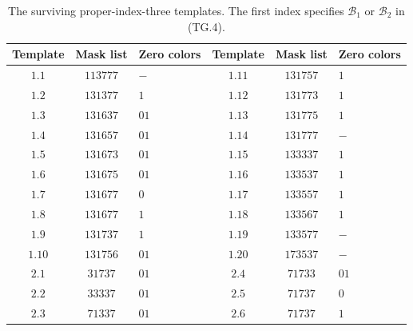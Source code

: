 \documentclass[11pt,a4paper]{article}
\theoremstyle{definition}
\begin{document}
\begin{table}[ht]
\centering
\begin{tabular}{ccl|ccl}
Template&Mask list&Zero colors&Template&Mask list&Zero colors\\\hline
$1.1$&$113777$&$-$&$1.11$&$131757$&$1$\\
$1.2$&$131377$&$1$&$1.12$&$131773$&$1$\\
$1.3$&$131637$&$01$&$1.13$&$131775$&$1$\\
$1.4$&$131657$&$01$&$1.14$&$131777$&$-$\\
$1.5$&$131673$&$01$&$1.15$&$133337$&$1$\\
$1.6$&$131675$&$01$&$1.16$&$133537$&$1$\\
$1.7$&$131677$&$0$&$1.17$&$133557$&$1$\\
$1.8$&$131677$&$1$&$1.18$&$133567$&$1$\\
$1.9$&$131737$&$1$&$1.19$&$133577$&$-$\\
$1.10$&$131756$&$01$&$1.20$&$173537$&$-$\\\hline
$2.1$&$31737$&$01$&$2.4$&$71733$&$01$\\
$2.2$&$33337$&$01$&$2.5$&$71737$&$0$\\
$2.3$&$71337$&$01$&$2.6$&$71737$&$1$
\end{tabular}
\caption{The surviving proper-index-three templates. The first index
specifies $\mathcal B_1$ or $\mathcal B_2$ in (TG.4).}
\label{tab:k12-ternary-templates}
\end{table}
\end{document}
